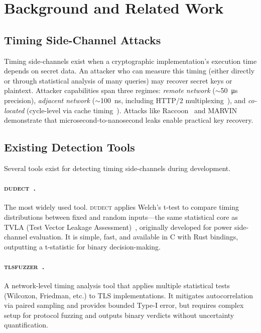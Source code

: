 \documentclass[letterpaper,twocolumn,10pt]{article}
\newcommand{\dudect}{\textsc{dudect}\xspace}
\newcommand{\tlsfuzzer}{\textsc{tlsfuzzer}\xspace}
\newcommand{\ns}[1]{\SI{#1}{\nano\second}}
\newcommand{\us}[1]{\SI{#1}{\micro\second}}
\begin{document}
\section{Background and Related Work}
\label{sec:background}

\subsection{Timing Side-Channel Attacks}
\label{sec:background:attacks}

Timing side-channels exist when a cryptographic implementation's execution time
depends on secret data. An attacker who can measure this timing (either directly
or through statistical analysis of many queries) may recover secret keys or
plaintext. Attacker capabilities span three regimes: \emph{remote network}
($\sim$\us{50} precision), \emph{adjacent network} ($\sim$\ns{100}, including
HTTP/2 multiplexing~\cite{timeless}), and \emph{co-located} (cycle-level via
cache timing~\cite{kyberslash}). Attacks like Raccoon~\cite{raccoon} and
MARVIN~\cite{marvin} demonstrate that microsecond-to-nanosecond leaks enable
practical key recovery.

\subsection{Existing Detection Tools}
\label{sec:background:tools}

Several tools exist for detecting timing side-channels during development.

\paragraph{\dudect~\cite{dudect}.}
The most widely used tool. \dudect applies Welch's t-test to compare timing
distributions between fixed and random inputs---the same statistical core as
TVLA (Test Vector Leakage Assessment)~\cite{tvla}, originally developed for
power side-channel evaluation. It is simple, fast, and available in C with
Rust bindings, outputting a t-statistic for binary decision-making.

\paragraph{\tlsfuzzer~\cite{tlsfuzzer}.}
A network-level timing analysis tool that applies multiple statistical tests
(Wilcoxon, Friedman, etc.) to TLS implementations. It mitigates autocorrelation
via paired sampling and provides bounded Type-I error, but requires complex setup
for protocol fuzzing and outputs binary verdicts without uncertainty quantification.
\end{document}
